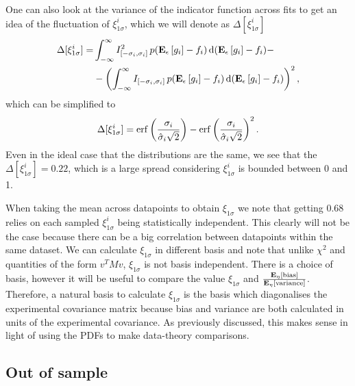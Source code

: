 One can also look at the variance of the indicator function across fits to get
an idea of the fluctuation of $\xi_{1\sigma}^{i}$, which we will denote as
$\Delta[\xi_{1\sigma}^{i}]$
\begin{equation}
    \label{eq:XiIVar}
    \begin{split}
        \Delta[\xi_{1\sigma}^{i}] 
        =& \int_{-\infty}^{\infty} I_{[-\sigma_i, \sigma_i]}^2\, 
            p(\mathbf{E}_{\epsilon}\left[ g_i \right] - f_i)\,
            {\rm d}(\mathbf{E}_{\epsilon}\left[ g_i \right] - f_i) - \\
        &- \left( \int_{-\infty}^{\infty} I_{[-\sigma_i, \sigma_i]}\,
            p(\mathbf{E}_{\epsilon}\left[ g_i \right] - f_i)\,
            {\rm d}(\mathbf{E}_{\epsilon}\left[ g_i \right] - f_i) \right)^2,
    \end{split}
\end{equation}
which can be simplified to
\begin{equation}
    \label{eq:XiIVarSimplified}
    \Delta[\xi_{1\sigma}^{i}] =
    {\rm erf} \left( \frac{\sigma_i}{\hat{\sigma}_i \sqrt{2}}\right) -
    {\rm erf} \left( \frac{\sigma_i}{\hat{\sigma}_i \sqrt{2}}\right)^2.
\end{equation}
Even in the ideal case that the distributions are the same, we see that the
$\Delta[\xi_{1\sigma}^{i}] = 0.22$, which is a large spread considering
$\xi_{1\sigma}^{i}$ is bounded between 0 and 1.

When taking the mean across datapoints to obtain $\xi_{1\sigma}$ we note that
getting 0.68 relies on each sampled $\xi_{1\sigma}^{i}$ being statistically
independent. This clearly will not be the case because there can be a big
correlation between datapoints within the same dataset. We can calculate
$\xi_{1\sigma}$ in different basis and note that unlike $\chi^2$ and quantities
of the form $v^T M v$, $\xi_{1\sigma}$ is not basis independent. There is a
choice of basis, however it will be useful to compare the value $\xi_{1\sigma}$
and $\frac{\mathbf{E}_{\eta}\left[ {\rm bias} \right]}{\mathbf{E}_{\eta}\left[ {\rm variance} \right]}$. Therefore, a natural basis to
calculate $\xi_{1\sigma}$ is the basis which diagonalises the experimental
covariance matrix because bias and variance are both calculated in units of the
experimental
covariance. As previously discussed, this makes sense in light of using the PDFs
to make data-theory comparisons.

\subsection{Out of sample}

